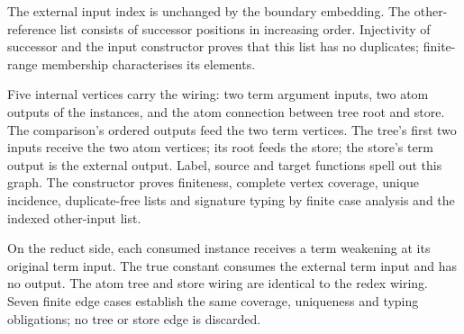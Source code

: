 

The external input index is unchanged by the boundary embedding. The
other-reference list consists of successor positions in increasing order.
Injectivity of successor and the input constructor proves that this list
has no duplicates; finite-range membership characterises its elements.





Five internal vertices carry the wiring: two term argument inputs, two
atom outputs of the instances, and the atom connection between tree root
and store. The comparison's ordered outputs feed the two term vertices.
The tree's first two inputs receive the two atom vertices; its root feeds
the store; the store's term output is the external output. Label, source
and target functions spell out this graph. The constructor proves finiteness,
complete vertex coverage, unique incidence, duplicate-free lists and
signature typing by finite case analysis and the indexed other-input list.





On the reduct side, each consumed instance receives a term weakening at
its original term input. The true constant consumes the external term
input and has no output. The atom tree and store wiring are identical to
the redex wiring. Seven finite edge cases establish the same coverage,
uniqueness and typing obligations; no tree or store edge is discarded.


